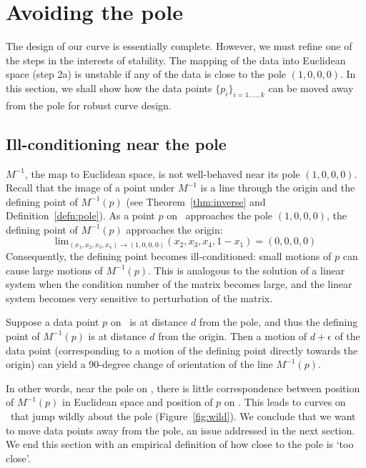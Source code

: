 \section{Avoiding the pole}
\label{sec:avoid}

The design of our curve is essentially complete.
However, we must refine one of the steps in the interests of stability.
The mapping of the data into Euclidean space (step 2a) is unstable
if any of the data is close to the pole $(1,0,0,0)$.
In this section, we shall show how the data points $\{p_i\}_{i=1,\ldots,k}$
can be moved away from the pole for robust curve design.

\subsection{Ill-conditioning near the pole}
\label{sec:ill}

$M^{-1}$, the map to Euclidean space, is not well-behaved near 
its pole $(1,0,0,0)$.
Recall that the image of a point under $M^{-1}$ is a line through the
origin and the defining point of $M^{-1}(p)$ (see Theorem~\ref{thm:inverse} 
and Definition~\ref{defn:pole}).
As a point $p$ on \ approaches the pole $(1,0,0,0)$,
the defining point of $M^{-1}(p)$ approaches the origin:
\[ 
\mbox{lim}_{(x_1,x_2,x_3,x_4) \rightarrow (1,0,0,0)} (x_2,x_3,x_4,1-x_1)
= (0,0,0,0) 
\]
Consequently, the defining point becomes ill-conditioned:
small motions of $p$ can cause large motions of $M^{-1}(p)$.
This is analogous to the solution of a linear
system when the condition number of the matrix becomes large,
and the linear system becomes very sensitive to perturbation of the matrix.

\begin{example}
Suppose a data point $p$ on \ is at distance $d$ from the pole,
and thus the defining point of $M^{-1}(p)$ is at distance $d$ from the
origin.
Then a motion of $d+\epsilon$ of the data point (corresponding to a motion
of the defining point directly towards the origin) can yield
a 90-degree change of orientation of the line $M^{-1}(p)$.
\end{example}

In other words, near the pole on , there is little correspondence 
between position of $M^{-1}(p)$ in Euclidean space 
and position of $p$ on .
This leads to curves on \ that jump wildly about the pole 
(Figure~\ref{fig:wild}).
We conclude that we want to move data points away from the pole,
an issue addressed in the next section.
We end this section with an empirical definition of how close to the pole
is `too close'.

